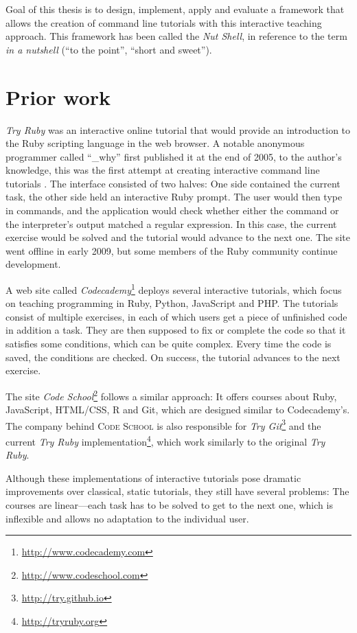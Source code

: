 \documentclass[paper=a4,twoside,abstract=on,cleardoublepage=empty,numbers=noenddot,toc=bib,toc=listof,12pt,appendixprefix=true]{scrreprt}
\begin{document}
Goal of this thesis is to design, implement, apply and evaluate a framework that allows the creation of command line tutorials with this interactive teaching approach. This framework has been called the \emph{Nut Shell}, in reference to the term \emph{in a nutshell} (“to the point”, “short and sweet”).

\section{Prior work}

\emph{Try Ruby} was an interactive online tutorial that would provide an introduction to the Ruby scripting language in the web browser. A notable anonymous programmer called “\_why” first published it at the end of 2005, to the author's knowledge, this was the first attempt at creating interactive command line tutorials \cite{why05}. The interface consisted of two halves: One side contained the current task, the other side held an interactive Ruby prompt. The user would then type in commands, and the application would check whether either the command or the interpreter's output matched a regular expression. In this case, the current exercise would be solved and the tutorial would advance to the next one.
The site went offline in early 2009, but some members of the Ruby community continue development.

A web site called \emph{Codecademy}\footnote{\url{http://www.codecademy.com}} deploys several interactive tutorials, which focus on teaching programming in Ruby, Python, JavaScript and PHP. The tutorials consist of multiple exercises, in each of which users get a piece of unfinished code in addition a task. They are then supposed to fix or complete the code so that it satisfies some conditions, which can be quite complex. Every time the code is saved, the conditions are checked. On success, the tutorial advances to the next exercise.

The site \emph{Code School}\footnote{\url{http://www.codeschool.com}} follows a similar approach: It offers courses about Ruby, JavaScript, HTML/CSS, R and Git, which are designed similar to Codecademy's. The company behind \textsc{Code School} is also responsible for \emph{Try Git}\footnote{\url{http://try.github.io}} and the current \emph{Try Ruby} implementation\footnote{\url{http://tryruby.org}}, which work similarly to the original \emph{Try Ruby}.

Although these implementations of interactive tutorials pose dramatic improvements over classical, static tutorials, they still have several problems: The courses are linear---each task has to be solved to get to the next one, which is inflexible and allows no adaptation to the individual user.
\end{document}
